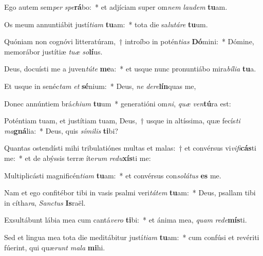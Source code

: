 \item Ego autem sem\textit{per} \textit{spe}\textbf{rá}bo:~* et adjíciam super om\textit{nem} \textit{lau}\textit{dem} \textbf{tu}am.
\item Os meum annuntiábit justí\textit{ti}\textit{am} \textbf{tu}am:~* tota die sa\textit{lu}\textit{tá}\textit{re} \textbf{tu}um.
\item Quóniam non cognóvi litteratúram,~† introíbo in potén\textit{ti}\textit{as} \textbf{Dó}mini:~* Dómine, memorábor justítiæ \textit{tu}\textit{æ} \textit{so}\textbf{lí}us.
\item Deus, docuísti me a juven\textit{tú}\textit{te} \textbf{me}a:~* et usque nunc pronuntiábo mira\textit{bí}\textit{li}\textit{a} \textbf{tu}a.
\item Et usque in senéc\textit{tam} \textit{et} \textbf{sé}nium:~* Deus, \textit{ne} \textit{de}\textit{re}\textbf{lín}quas me,
\item Donec annúntiem brá\textit{chi}\textit{um} \textbf{tu}um~* generatióni om\textit{ni}, \textit{quæ} \textit{ven}\textbf{tú}ra est:
\item Poténtiam tuam, et justítiam tuam, Deus,~† usque in altíssima, quæ fecís\textit{ti} \textit{ma}\textbf{gná}lia:~* Deus, quis \textit{sí}\textit{mi}\textit{lis} \textbf{ti}bi?
\item Quantas ostendísti mihi tribulatiónes multas et malas:~† et convérsus vi\textit{vi}\textit{fi}\textbf{cás}ti me:~* et de abýssis terræ íte\textit{rum} \textit{re}\textit{du}\textbf{xís}ti me:
\item Multiplicásti magnificén\textit{ti}\textit{am} \textbf{tu}am:~* et convérsus con\textit{so}\textit{lá}\textit{tus} \textbf{es} me.
\item Nam et ego confitébor tibi in vasis psalmi veri\textit{tá}\textit{tem} \textbf{tu}am:~* Deus, psallam tibi in cítha\textit{ra}, \textit{Sanc}\textit{tus} \textbf{Is}raël.
\item Exsultábunt lábia mea cum cantá\textit{ve}\textit{ro} \textbf{ti}bi:~* et ánima mea, \textit{quam} \textit{red}\textit{e}\textbf{mís}ti.
\item Sed et lingua mea tota die meditábitur justí\textit{ti}\textit{am} \textbf{tu}am:~* cum confúsi et revériti fúerint, qui quæ\textit{runt} \textit{ma}\textit{la} \textbf{mi}hi.
